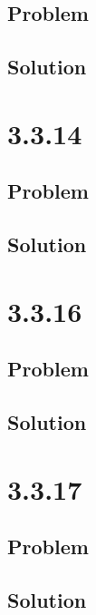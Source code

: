 \documentclass[12pt]{article}
\begin{document}
\subsection*{Problem}

\subsection*{Solution}



\section*{3.3.14}

\subsection*{Problem}

\subsection*{Solution}



\section*{3.3.16}

\subsection*{Problem}

\subsection*{Solution}



\section*{3.3.17}

\subsection*{Problem}

\subsection*{Solution}
\end{document}
